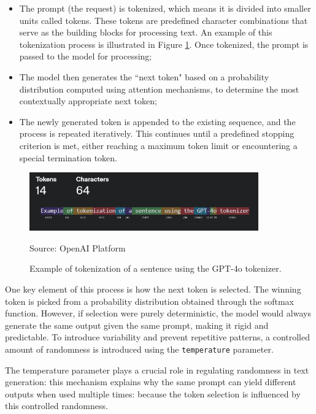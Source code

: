 \begin{itemize}
  \item The prompt (the request) is tokenized, which means it is divided into
    smaller units called tokens. These tokens are predefined character combinations
    that serve as the building blocks for processing text. An example of this
    tokenization process is illustrated in Figure \ref{fig:tokenization_example}.
    Once tokenized, the prompt is passed to the model for processing;

  \item The model then generates the ``next token" based on a probability
    distribution computed using attention mechanisms, to determine the most contextually
    appropriate next token;

  \item The newly generated token is appended to the existing sequence, and the
    process is repeated iteratively. This continues until a predefined stopping criterion
    is met, either reaching a maximum token limit or encountering a special
    termination token.
\end{itemize}

\begin{figure}[h!]
  \centering
  \includegraphics[width=0.88\textwidth]{images/tokenization_example.png}
  \caption{Example of tokenization of a sentence using the GPT-4o tokenizer.}
  { Source: OpenAI Platform\footnotemark} \label{fig:tokenization_example}
\end{figure}

One key element of this process is how the next token is selected. The winning token
is picked from a probability distribution obtained through the softmax function.
However, if selection were purely deterministic, the model would always generate
the same output given the same prompt, making it rigid and predictable. To
introduce variability and prevent repetitive patterns, a controlled amount of randomness
is introduced using the \texttt{temperature} parameter.

The temperature parameter plays a crucial role in regulating randomness in text
generation: this mechanism explains why the same prompt can yield different outputs
when used multiple times: because the token selection is influenced by this
controlled randomness.

